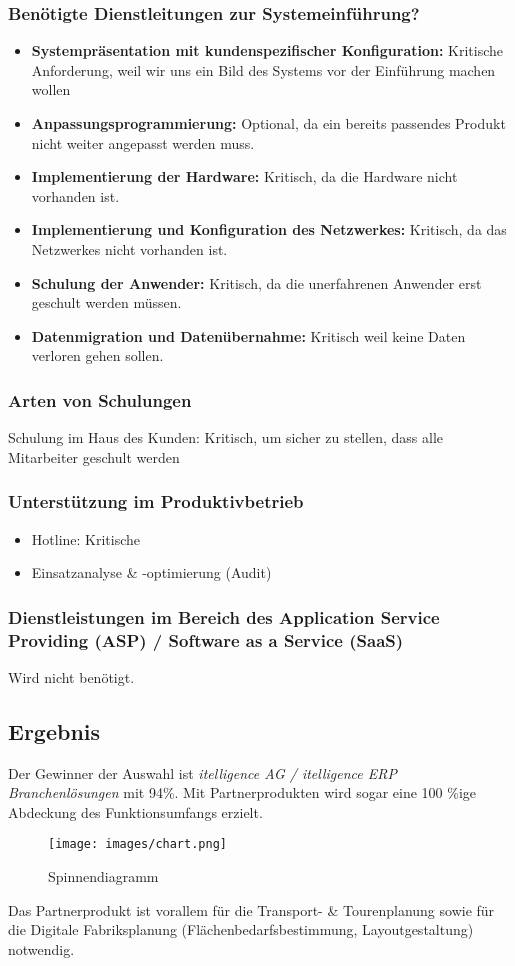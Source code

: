 \subsubsection{Benötigte Dienstleitungen zur Systemeinführung?}
\begin{itemize}
	\item \textbf{Systempräsentation mit kundenspezifischer Konfiguration:} Kritische Anforderung, weil wir uns ein Bild des Systems vor der Einführung machen wollen
	\item \textbf{Anpassungsprogrammierung:} Optional, da ein bereits passendes Produkt nicht weiter angepasst werden muss.
	\item \textbf{Implementierung der Hardware:} Kritisch, da die Hardware nicht vorhanden ist.
	\item \textbf{Implementierung und Konfiguration des Netzwerkes:} Kritisch, da das Netzwerkes nicht vorhanden ist.
	\item \textbf{Schulung der Anwender:} Kritisch, da die unerfahrenen Anwender erst geschult werden müssen.
	\item \textbf{Datenmigration und Datenübernahme:} Kritisch weil keine Daten verloren gehen sollen.
\end{itemize}
\subsubsection{Arten von Schulungen}
Schulung im Haus des Kunden: Kritisch, um sicher zu stellen, dass alle Mitarbeiter geschult werden

\subsubsection{Unterstützung im Produktivbetrieb}
\begin{itemize}
	\item Hotline: Kritische
	\item Einsatzanalyse \& -optimierung (Audit)
\end{itemize}

\subsubsection{Dienstleistungen im Bereich des Application Service Providing (ASP) / Software as a Service (SaaS)}
Wird nicht benötigt.
\newpage
\subsection{Ergebnis}
Der Gewinner der Auswahl ist \textit{itelligence AG / itelligence ERP Branchenlösungen} mit 94\%. Mit Partnerprodukten wird sogar eine 100 \%ige Abdeckung des Funktionsumfangs erzielt. 

\begin{figure}[H]
\begin{center}
\texttt{[image: images/chart.png]}
\caption{Spinnendiagramm}
\end{center}
\end{figure}
\noindent
Das Partnerprodukt ist vorallem für die Transport- \& Tourenplanung sowie für die Digitale Fabriksplanung (Flächenbedarfsbestimmung, Layoutgestaltung) notwendig.
